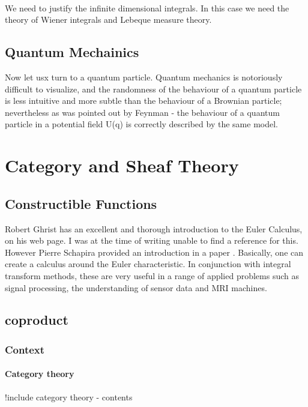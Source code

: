 \documentclass[preprint, 5p, 10pt]{elsarticle}
\theoremstyle{plain}
\begin{document}
   \paragraph{} We need to justify the infinite dimensional integrals. In this case we need the theory of Wiener integrals and Lebeque measure theory. 
\subsection{Quantum Mechainics}
Now let usx turn to a quantum particle. Quantum mechanics is notoriously difficult to visualize, and the randomness of the behaviour of a quantum
particle is less intuitive and more subtle than the behaviour of a Brownian particle; nevertheless as was pointed out by Feynman - the behaviour
of a quantum particle in a potential field U(q) is correctly described by the same model. 
\section{Category and Sheaf Theory}
\subsection{Constructible Functions}
Robert Ghrist has an excellent and thorough introduction to the Euler Calculus, on his web page. I was at the time of writing unable 
to find a reference for this. However Pierre Schapira provided an introduction in a paper \cite{Schapira199183}. Basically, one can create 
a calculus around the Euler characteristic. In conjunction with integral transform methods, these are very useful in a range of applied problems
such as signal processing, the understanding of sensor data and MRI machines. 
\subsection{coproduct}

\hypertarget{context_1}{}\subsubsection*{{Context}}\label{context_1}

\hypertarget{category_theory_2}{}\paragraph*{{Category theory}}\label{category_theory_2}

!include category theory - contents
\end{document}
